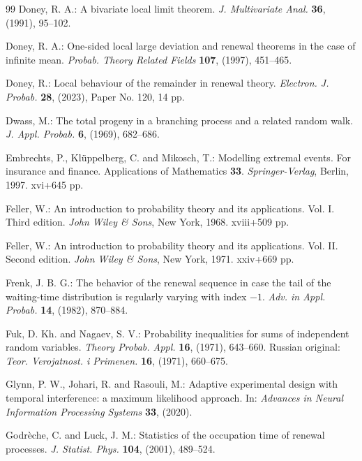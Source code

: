 \documentclass[EJP,preprint]{ejpecp}
\theoremstyle{ejpecpbodyit}
\begin{document}
\begin{thebibliography}{99}
 Doney, R. A.: A bivariate local limit theorem. \emph{J.
  Multivariate Anal.} \textbf{36}, (1991), 95--102. 

 Doney, R. A.: One-sided local large deviation and renewal theorems in
  the case of infinite mean. \emph{Probab. Theory Related Fields} \textbf{107}, (1997),
  451--465. 

 Doney, R.: Local behaviour of the remainder in renewal
  theory. \emph{Electron. J. Probab.} \textbf{28}, (2023), Paper No. 120,
  14 pp. 

 Dwass, M.: The total progeny in a branching process and a related
  random walk. \emph{J. Appl. Probab.} \textbf{6}, (1969), 682--686. 

 Embrechts, P., Kl\"uppelberg, C. and Mikosch, T.: Modelling
  extremal events. For insurance and finance. Applications of Mathematics
  \textbf{33}. \emph{Springer-Verlag}, Berlin, 1997. xvi+645 pp.

 Feller, W.: An introduction to probability theory and its
  applications. Vol. I. Third edition. \emph{John Wiley \& Sons}, New York,
  1968. xviii+509 pp. 

 Feller, W.: An introduction to probability theory and its
  applications. Vol. II. Second edition. \emph{John Wiley \& Sons}, New York,
  1971. xxiv+669 pp. 

 Frenk, J. B. G.: The behavior of the renewal sequence in
  case the tail of the waiting-time distribution is regularly varying with
  index $-1$. \emph{Adv. in Appl. Probab.} \textbf{14}, (1982), 870--884.

 Fuk, D. Kh. and Nagaev, S. V.: Probability
  inequalities for sums of independent random variables. \emph{Theory Probab.
  Appl.} \textbf{16}, (1971), 643--660. Russian original: \emph{Teor.
  Verojatnost. i Primenen.} \textbf{16}, (1971), 660--675. 

 Glynn, P. W., Johari, R. and Rasouli, M.: Adaptive experimental design
  with temporal interference: a maximum likelihood approach. In: \emph{Advances in Neural
  Information Processing Systems} \textbf{33}, (2020). 

 Godr\`eche, C. and Luck, J. M.: Statistics of the
  occupation time of renewal processes. \emph{J. Statist. Phys.}
  \textbf{104}, (2001), 489--524. 


\end{thebibliography}
\end{document}
